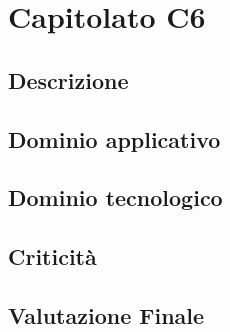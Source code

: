 \section {Capitolato C6}
	\subsection {Descrizione}
	\subsection {Dominio applicativo}
	\subsection {Dominio tecnologico}
	\subsection {Criticità}
	\subsection {Valutazione Finale}